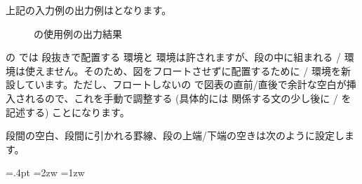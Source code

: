 上記の入力例の出力例はとなります。
\begin{figure}[htbp]
   \IOmargin
   \caption{の使用例の出力結果}\label{fig:multicol}%
\end{figure}
の  では 段抜きで配置する 
環境と  環境は許されますが、段の中に組まれる /
環境は使えません。そのため、図をフロートさせずに配置するために
/ 環境を新設しています。ただし、フロートしないの
で図表の直前/直後で余計な空白が挿入されるので、これを手動で調整する (具体的には
関係する文の少し後に / を記述する) ことになります。

段間の空白、段間に引かれる罫線、段の上端/下端の空きは次のように設定しま
す。 
\begin{inputex}
\columnseprule=.4pt %
\columnsep=2zw %
\multicolsep=1zw %
\end{inputex}

